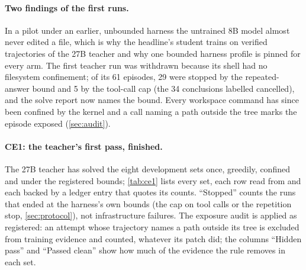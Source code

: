 \paragraph{Two findings of the first runs.} In a pilot under an earlier,
unbounded harness the untrained 8B model almost never edited a file, which is why the headline's
student trains on verified trajectories of the 27B teacher and why one bounded harness profile is
pinned for every arm. The first teacher run was withdrawn because its shell had no filesystem
confinement; of its 61 episodes, 29 were stopped by the repeated-answer bound and 5 by the tool-call
cap (the 34 conclusions labelled cancelled), and the solve report now names the bound.
Every workspace command has since been confined by the kernel and a call naming a path outside the
tree marks the episode exposed (\cref{sec:audit}).

\begin{table}[tbp]
\centering\small

\caption{Paired outcomes over qualification-partition families (wins: the adapter resolves more
of the family than the base; losses: fewer), with the exact one-sided sign test. Every cell is
read from a finished run; none is an estimate.}\label{tab:results}
\end{table}

\paragraph{CE1: the teacher's first pass, finished.} The 27B teacher has solved the eight development sets once, greedily, confined and under the registered bounds; \cref{tab:ce1} lists every set, each row read from  and each backed by a ledger entry that quotes its counts. ``Stopped'' counts the runs that ended at the harness's own bounds (the cap on tool calls or the repetition stop, \cref{sec:protocol}), not infrastructure failures. The exposure audit is applied as registered: an attempt whose trajectory names a path outside its tree is excluded from training evidence and counted, whatever its patch did; the columns ``Hidden pass'' and ``Passed clean'' show how much of the evidence the rule removes in each set.

\begin{table}[tbp]
\centering\small

\caption{CE1, teacher pass 1 on development sets that have finished. Success and cancelled count solve conclusions, the other columns the verified outcome; exposed attempts are counted among the failed.}\label{tab:ce1}
\end{table}

